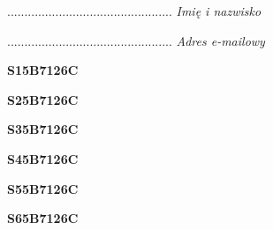 \begin{turn}{90}\begin{minipage}{\linewidth} \vspace{20mm} ................................................  \textit{Imię i nazwisko}\end{minipage}\end{turn}

\begin{turn}{90}\begin{minipage}{\linewidth} \vspace{20mm} ................................................  \textit{Adres e-mailowy}\end{minipage}\end{turn}

\begin{turn}{90}\huge \begin{minipage}{\linewidth} \vspace{10mm}\textbf{S15B7126C}\end{minipage}\end{turn}

\begin{turn}{90}\huge \begin{minipage}{\linewidth} \vspace{10mm}\textbf{S25B7126C}\end{minipage}\end{turn}

\begin{turn}{90}\huge \begin{minipage}{\linewidth} \vspace{10mm}\textbf{S35B7126C}\end{minipage}\end{turn}

\begin{turn}{90}\huge \begin{minipage}{\linewidth} \vspace{10mm}\textbf{S45B7126C}\end{minipage}\end{turn}

\begin{turn}{90}\huge \begin{minipage}{\linewidth} \vspace{10mm}\textbf{S55B7126C}\end{minipage}\end{turn}

\begin{turn}{90}\huge \begin{minipage}{\linewidth} \vspace{10mm}\textbf{S65B7126C}\end{minipage}\end{turn}

